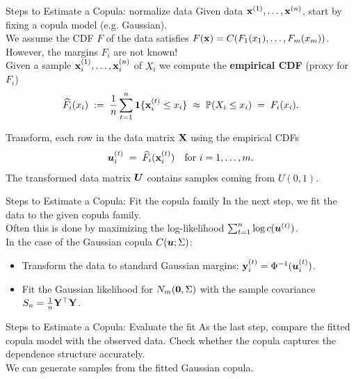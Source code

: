\documentclass[11pt,handout,aspectratio=169]{beamer}
\begin{document}
\begin{frame}{Steps to Estimate a Copula: normalize data}
	Given data $\mathbf{x}^{(1)},\ldots,\mathbf{x}^{(n)}$, start by fixing a copula model (e.g. Gaussian).\\[3mm]
	
	We assume the CDF $F$ of the data satisfies $F(\mathbf{x})=C(F_1(x_1),\ldots,F_m(x_m))$.\\[3mm]
	
	However, \alert{the margins $F_i$ are not known!}\\[3mm]
	
	Given a sample $\mathbf{x}_i^{(1)},\ldots,\mathbf{x}_i^{(n)}$ of $X_i$ we compute the \textbf{empirical CDF} (proxy for $F_i$)
	$$
	\widehat F_i(x_i)\;:=\;\frac1n \sum_{t=1}^n \boldsymbol 1\{\mathbf{x}_i^{(t)}\leq x_i\}\;\approx\;\mathbb P(X_i\leq x_i)\;=\;F_i(x_i).
	$$
	\vspace{-5mm}
\begin{alertblock}{}
	Transform, each row in the data matrix $\mathbf{X}$ using the empirical CDFs
$$
\boldsymbol u^{(t)}_i\;=\;\widehat F_i(\mathbf{x}^{(t)}_i)\quad\mbox{for } i=1,\ldots,m.
$$
The transformed data matrix $\boldsymbol U$ contains samples coming from $U(0,1)$.
\end{alertblock}\end{frame}


\begin{frame}{Steps to Estimate a Copula: Fit the copula family}
In the next step, we fit the data to the given copula family. \\[3mm]

Often this is done by maximizing the log-likelihood $\sum_{t=1}^n \log c(\boldsymbol u^{(t)})$.\\[3mm]

In the case of the Gaussian copula $C(\boldsymbol u;\Sigma)$:
\begin{itemize}
	\item Transform the data to standard Gaussian margins: $\mathbf{y}^{(t)}_i=\Phi^{-1}(\boldsymbol u^{(t)}_i)$.
	\item Fit the Gaussian likelihood for $N_m(\boldsymbol 0,\Sigma)$ with the sample covariance  $S_n=\tfrac1n \mathbf{Y}^\top \mathbf{Y}$.
\end{itemize}
\end{frame}


\begin{frame}{Steps to Estimate a Copula: Evaluate the fit}
As the last step, compare the fitted copula model with the observed data. Check whether the copula captures the dependence structure accurately.\\[3mm]
We can generate samples from the fitted Gaussian copula.
\end{frame}
\end{document}
